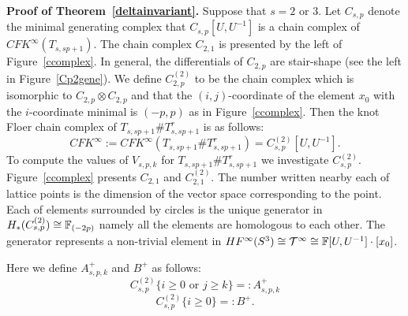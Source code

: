 \documentclass[11pt]{amsart}
\begin{document}
{\bf Proof of Theorem~\ref{deltainvariant}.}
Suppose that $s=2$ or $3$.
Let $C_{s,p}$ denote the minimal generating complex that $C_{s,p}[U,U^{-1}]$ is a chain complex of $CFK^\infty(T_{s,sp+1})$.
The chain complex $C_{2,1}$ is presented by the left of {\sc Figure}~\ref{ccomplex}.
In general, the differentials of $C_{2,p}$ are stair-shape (see the left in {\sc Figure}~\ref{Cp2gene}).
We define $C_{2,p}^{(2)}$ to be the chain complex which is isomorphic to $C_{2,p}\otimes C_{2,p}$ and that the $(i,j)$-coordinate of the element $x_0$ with the $i$-coordinate minimal is $(-p,p)$
as in {\sc Figure}~\ref{ccomplex}.
Then the knot Floer chain complex of $T_{s,sp+1}\#T_{s,sp+1}^r$ is as follows:
$$CFK^\infty:=CFK^\infty(T_{s,sp+1}\#T_{s,sp+1}^r)=C_{s,p}^{(2)}[U,U^{-1}].$$
To compute the values of $V_{s,p,k}$ for $T_{s,sp+1}\#T_{s,sp+1}^r$ we investigate $C_{s,p}^{(2)}$.
{\sc Figure}~\ref{ccomplex} presents $C_{2,1}$ and $C_{2,1}^{(2)}$.
The number written nearby each of lattice points is the dimension of the vector space corresponding to the point.
Each of elements surrounded by circles is the unique generator in $H_\ast(C_{s,p}^{(2)})\cong {\Bbb F}_{(-2p)}$
namely all the elements are homologous to each other.
The generator represents a non-trivial element in $HF^\infty(S^3)\cong {\mathcal T}^\infty\cong {\Bbb F}[U,U^{-1}]\cdot [x_0]$.

Here we define $A_{s,p,k}^+$ and $B^+$ as follows:
$$C_{s,p}^{(2)}\{i\ge 0\text{ or }j\ge k\}=:A_{s,p,k}^+$$
$$C_{s,p}^{(2)}\{i\ge 0\}=:B^+.$$
\end{document}
